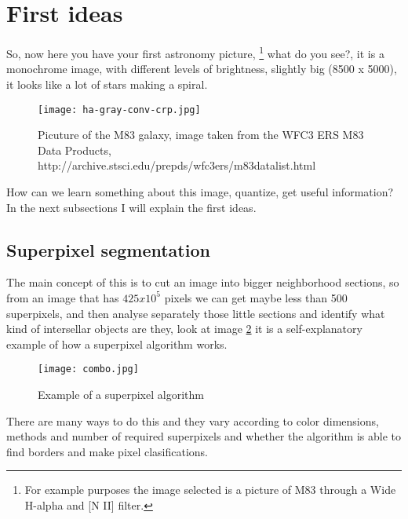 \documentclass[11pt,fleqn]{book} %
\begin{document}
\section{First ideas}
So, now here you have your first astronomy picture, \footnote{For example purposes the image selected is a picture of M83 through a Wide H-alpha and [N II] filter. } what do you see?, it is a monochrome image, with different levels of brightness, slightly big (8500 x 5000), it looks like a lot of stars making a spiral.
\begin{figure}[h]
    \centering
    \texttt{[image: ha-gray-conv-crp.jpg]}
    \caption{Picuture of the M83 galaxy, image taken from the WFC3 ERS M83 Data Products, http://archive.stsci.edu/prepds/wfc3ers/m83datalist.html}
    \label{fig:awesome_image}
\end{figure}

How can we learn something about this image, quantize, get useful information? In the next subsections I will explain the first ideas.

\subsection{Superpixel segmentation}
The main concept of this is to cut an image into bigger neighborhood sections, so from an image that has $425x10^5$ pixels we can get maybe less than 500 superpixels, and then analyse separately those little sections and identify what kind of intersellar objects are they, look at image \ref{fig:super} it is a self-explanatory example of how a superpixel algorithm works.
\begin{figure}[h]
    \centering
    \texttt{[image: combo.jpg]}
    \caption{Example of a superpixel algorithm}
    \label{fig:super}
\end{figure}
There are many ways to do this and they vary according to color dimensions, methods and number of required superpixels and whether the algorithm is able to find borders and make pixel clasifications.
\end{document}
